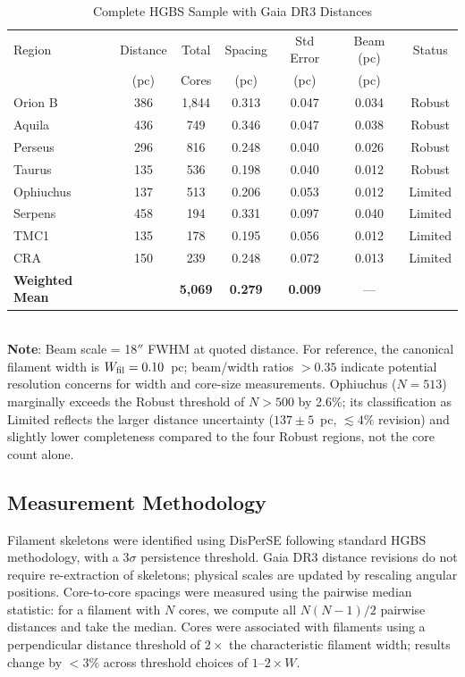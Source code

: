 \documentclass[twoside,twocolumn]{mnras}
\begin{document}
\begin{table}
\caption{Complete HGBS Sample with Gaia DR3 Distances}
\label{tab:sample}
\begin{tabular}{lcccccc}
\toprule
Region & Distance & Total & Spacing & Std Error & Beam (pc) & Status \\
       & (pc)   & Cores & (pc)   & (pc)      & (pc) & \\
\midrule
Orion B  & 386 & 1,844 & 0.313 & 0.047 & 0.034 & Robust \\
Aquila   & 436 & 749   & 0.346 & 0.047 & 0.038 & Robust \\
Perseus  & 296 & 816   & 0.248 & 0.040 & 0.026 & Robust \\
Taurus   & 135 & 536   & 0.198 & 0.040 & 0.012 & Robust \\
Ophiuchus& 137 & 513   & 0.206 & 0.053 & 0.012 & Limited \\
Serpens  & 458 & 194   & 0.331 & 0.097 & 0.040 & Limited \\
TMC1     & 135 & 178   & 0.195 & 0.056 & 0.012 & Limited \\
CRA      & 150 & 239   & 0.248 & 0.072 & 0.013 & Limited \\
\midrule
\textbf{Weighted Mean} &  & \textbf{5,069} & \textbf{0.279} & \textbf{0.009} & --- &  \\
\bottomrule
\end{tabular}
\\ \footnotesize \textbf{Note}: Beam scale = 18$''$ FWHM at quoted distance. For reference, the canonical filament width is $W_{\rm fil} = 0.10$~pc; beam/width ratios $> 0.35$ indicate potential resolution concerns for width and core-size measurements. Ophiuchus ($N = 513$) marginally exceeds the Robust threshold of $N > 500$ by 2.6\%; its classification as Limited reflects the larger distance uncertainty ($137 \pm 5$~pc, $\lesssim 4\%$ revision) and slightly lower completeness compared to the four Robust regions, not the core count alone.
\end{table}

\subsection{Measurement Methodology}

Filament skeletons were identified using DisPerSE \citep{Sousbie2011} following standard
HGBS methodology, with a $3\sigma$ persistence threshold. Gaia DR3 distance revisions
do not require re-extraction of skeletons; physical scales are updated by rescaling
angular positions. Core-to-core spacings were measured using the pairwise median
statistic: for a filament with $N$ cores, we compute all $N(N-1)/2$ pairwise distances
and take the median. Cores were associated with filaments using a perpendicular
distance threshold of $2\times$ the characteristic filament width; results change
by $<3\%$ across threshold choices of $1$--$2\times W$.
\end{document}

